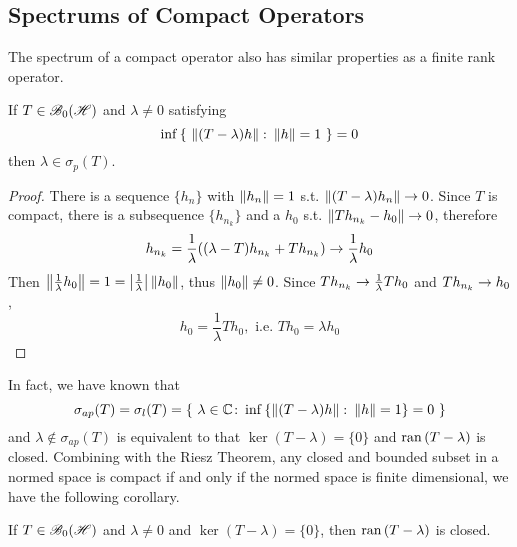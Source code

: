 \subsection{Spectrums of Compact Operators}

The spectrum of a compact operator also has similar properties as a finite rank operator.

\begin{thm}
	If $T \in \mathscr{B}_{0}\mathscr{(H)}$ and $\lambda \neq 0$ satisfying
	\begin{equation*}
		\operatorname{inf}{\{~\left\lVert(T-\lambda)h\right\lVert \colon \left\lVert h\right\lVert=1~\}} = 0
	\end{equation*}
	then $\lambda \in \sigma_p(T)$.
\end{thm}
\begin{proof}
	There is a sequence $\{h_n\}$ with $\left\lVert h_n\right\lVert=1$ s.t. $\left\lVert(T-\lambda)h_n\right\lVert \rightarrow 0$. Since $T$ is compact, there is a subsequence $\{h_{n_k}\}$ and a $h_0$ s.t. $\left\lVert Th_{n_k}-h_0\right\lVert \rightarrow 0$, therefore
	\begin{equation*}
		h_{n_k} = \frac{1}{\lambda}((\lambda-T)h_{n_k}+Th_{n_k}) \rightarrow \frac{1}{\lambda}h_0
	\end{equation*}
	Then $\left\lVert\frac{1}{\lambda}h_0\right\lVert=1=\left\lvert\frac{1}{\lambda}\right\lvert\left\lVert h_0\right\lVert$, thus $\left\lVert h_0\right\lVert \neq 0$. Since $Th_{n_k} \rightarrow \frac{1}{\lambda}Th_0$ and $Th_{n_k} \rightarrow h_0$,
	\begin{equation*}
		h_0 = \frac{1}{\lambda}Th_0, \text{ i.e. } Th_0 = \lambda h_0
	\end{equation*}
\end{proof}

In fact, we have known that
\begin{equation*}
	\sigma_{ap}(T) = \sigma_l(T) = \{~\lambda \in \mathbb{C} \colon \operatorname{inf}{\{\left\lVert(T-\lambda)h\right\lVert \colon \left\lVert h\right\lVert=1\}} = 0~\}
\end{equation*}
and $\lambda \notin \sigma_{ap}(T)$ is equivalent to that $\ker{(T-\lambda)} = \{0\}$ and $\operatorname{ran}{(T-\lambda)}$ is closed. Combining with the Riesz Theorem, any closed and bounded subset in a normed space is compact if and only if the normed space is finite dimensional, we have the following corollary.

\begin{cor}
	If $T \in \mathscr{B}_{0}\mathscr{(H)}$ and $\lambda \neq 0$ and $\ker{(T-\lambda)} = \{0\}$, then $\operatorname{ran}{(T-\lambda)}$ is closed.
\end{cor}

